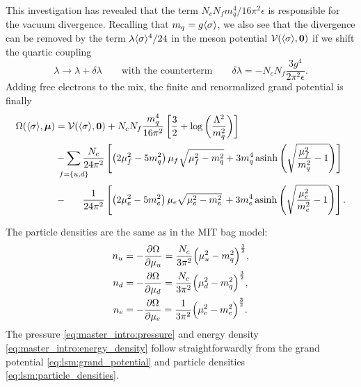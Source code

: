 This investigation has revealed that the term $N_c N_f m_q^4 / 16 \pi^2 \epsilon$ is responsible for the vacuum divergence.
Recalling that $m_q=g \langle \sigma \rangle$,
we also see that the divergence can be removed by the term $\lambda \langle \sigma \rangle^4 / 24$ in the meson potential $\mathcal{V}(\langle \sigma \rangle,{\bm{0}})$
if we shift the quartic coupling
\begin{equation}
	\lambda \rightarrow \lambda + \delta\lambda
	\qquad \text{with the counterterm} \qquad
	\delta\lambda = -N_c N_f \frac{3 g^4}{2 \pi^2 \epsilon} .
\end{equation}
Adding free electrons to the mix, the finite and renormalized grand potential is finally
\begin{equation}
\begin{split}
	\Omega(\avg{\sigma},\vec{\mu}) &= \pot(\avg{\sigma},\vec{0}) + N_c N_f \frac{m_q^4}{16 \pi^2} \left[ \frac{3}{2} + \log\left(\frac{{\Lambda}^2}{m_q^2}\right) \right] \\
	                               &-\smashoperator{\sum_{\vphantom{\big|} f=\{u,d\}}} \frac{N_c}{24 \pi^2} \left[ \left( 2 \mu_f^2 - 5 m_q^2 \right) \mu_f \sqrt{\mu_f^2 - m_q^2} + 3 m_q^4 \asinh \left( \sqrt{\frac{\mu_{\smash{f}}^2}{m_q^2}-1} \right) \right] \\
	                               &-\phantom{\sum} \, \frac{1}{24 \pi^2} \left[ \left( 2 \mu_e^2 - 5 m_e^2 \right) \mu_e \sqrt{\mu_e^2 - m_e^2} \, + 3 m_e^4 \asinh \left( \sqrt{\frac{\mu_{\smash{e}}^2}{m_e^2}-1} \right) \right].
\end{split}
\label{eq:lsm:grand_potential}
\end{equation}

The particle densities are the same as in the MIT bag model:
\begin{subequations}
\begin{align}
	n_u &= -\pdv{\Omega}{\mu_u} = \frac{N_c}{3 \pi^2} \Big( \mu_u^2 - m_q^2 \Big)^{\frac32}, \\
	n_d &= -\pdv{\Omega}{\mu_d} = \frac{N_c}{3 \pi^2} \Big( \mu_d^2 - m_q^2 \Big)^{\frac32}, \\
	n_e &= -\pdv{\Omega}{\mu_e} = \frac{  1}{3 \pi^2} \Big( \mu_e^2 - m_e^2 \Big)^{\frac32}.
\end{align}%
\label{eq:lsm:particle_densities}%
\end{subequations}%
The pressure \eqref{eq:master_intro:pressure} and energy density \eqref{eq:master_intro:energy_density} follow straightforwardly from the grand potential \eqref{eq:lsm:grand_potential} and particle densities \eqref{eq:lsm:particle_densities}.


